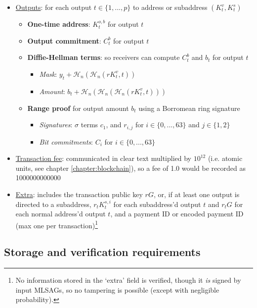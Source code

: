 \begin{itemize}
    \item \underline{Outputs}: for each output $t \in \{1,...,p\}$ to address or subaddress $(K^v_t,K^s_t)$
    \begin{itemize}
        \item \textbf{One-time address}: $K^{o,b}_t$ for output $t$
        \item \textbf{Output commitment}: $C^{b}_t$ for output $t$
        \item \textbf{Diffie-Hellman terms}: so receivers can compute $C^{b}_t$ and $b_t$ for output $t$
        \begin{itemize}
            \item \textit{Mask}: $y_t + \mathcal{H}_n(\mathcal{H}_n(r K^v_t,t))$
            \item \textit{Amount}: $b_t + \mathcal{H}_n(\mathcal{H}_n(\mathcal{H}_n(r K^v_t,t)))$
        \end{itemize}
        \item \textbf{Range proof} for output amount $b_t$ using a Borromean ring signature
        \begin{itemize}
            \item \textit{Signatures}: $\sigma$ terms $c_1$, and $r_{i,j}$ for $i \in \{0,...,63\}$ and $j \in \{1,2\}$
            \item \textit{Bit commitments}: $C_i$ for $i \in \{0,...,63\}$
        \end{itemize}
    \end{itemize}
    \item \underline{Transaction fee}: communicated in clear text multiplied by $10^{12}$ (i.e. atomic units, see chapter \ref{chapter:blockchain}), so a fee of 1.0 would be recorded as 1000000000000
    \item \underline{Extra}: includes the transaction public key $r G$, or, if at least one output is directed to a subaddress, $r_t K^{s,i}_t$ for each subaddress'd output $t$ and $r_t G$ for each normal address'd output $t$, and a payment ID or encoded payment ID (max one per transaction)\footnote{No information stored in the `extra' field is verified, though it {\em is} signed by input MLSAGs, so no tampering is possible (except with negligible probability).}
\end{itemize}

\newpage
\subsection{Storage and verification requirements}

